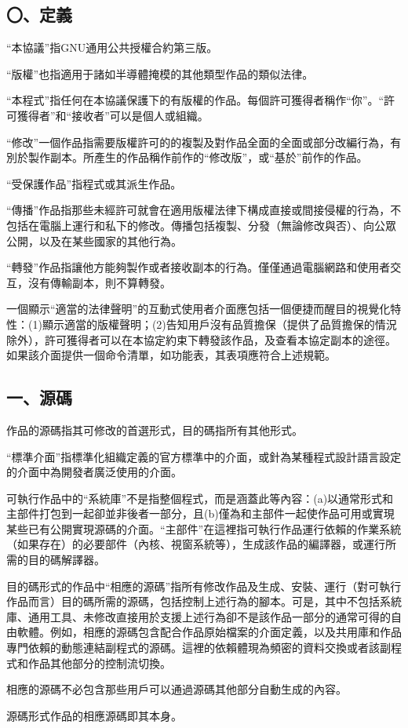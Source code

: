 \subsection{〇、定義}
“本協議”指GNU通用公共授權合約第三版。\par
“版權”也指適用于諸如半導體掩模的其他類型作品的類似法律。\par
“本程式”指任何在本協議保護下的有版權的作品。每個許可獲得者稱作“你”。“許可獲得者”和“接收者”可以是個人或組織。\par
“修改”一個作品指需要版權許可的的複製及對作品全面的全面或部分改編行為，有別於製作副本。所產生的作品稱作前作的“修改版”，或“基於”前作的作品。\par
“受保護作品”指程式或其派生作品。\par
“傳播”作品指那些未經許可就會在適用版權法律下構成直接或間接侵權的行為，不包括在電腦上運行和私下的修改。傳播包括複製、分發（無論修改與否）、向公眾公開，以及在某些國家的其他行為。\par
“轉發”作品指讓他方能夠製作或者接收副本的行為。僅僅通過電腦網路和使用者交互，沒有傳輸副本，則不算轉發。\par
一個顯示“適當的法律聲明”的互動式使用者介面應包括一個便捷而醒目的視覺化特性：(1)顯示適當的版權聲明；(2)告知用戶沒有品質擔保（提供了品質擔保的情況除外），許可獲得者可以在本協定約束下轉發該作品，及查看本協定副本的途徑。如果該介面提供一個命令清單，如功能表，其表項應符合上述規範。
\subsection{一、源碼}
作品的源碼指其可修改的首選形式，目的碼指所有其他形式。\par
“標準介面”指標準化組織定義的官方標準中的介面，或針為某種程式設計語言設定的介面中為開發者廣泛使用的介面。\par
可執行作品中的“系統庫”不是指整個程式，而是涵蓋此等內容：(a)以通常形式和主部件打包到一起卻並非後者一部分，且(b)僅為和主部件一起使作品可用或實現某些已有公開實現源碼的介面。“主部件”在這裡指可執行作品運行依賴的作業系統（如果存在）的必要部件（內核、視窗系統等），生成該作品的編譯器，或運行所需的目的碼解譯器。\par
目的碼形式的作品中“相應的源碼”指所有修改作品及生成、安裝、運行（對可執行作品而言）目的碼所需的源碼，包括控制上述行為的腳本。可是，其中不包括系統庫、通用工具、未修改直接用於支援上述行為卻不是該作品一部分的通常可得的自由軟體。例如，相應的源碼包含配合作品原始檔案的介面定義，以及共用庫和作品專門依賴的動態連結副程式的源碼。這裡的依賴體現為頻密的資料交換或者該副程式和作品其他部分的控制流切換。\par
相應的源碼不必包含那些用戶可以通過源碼其他部分自動生成的內容。\par
源碼形式作品的相應源碼即其本身。
